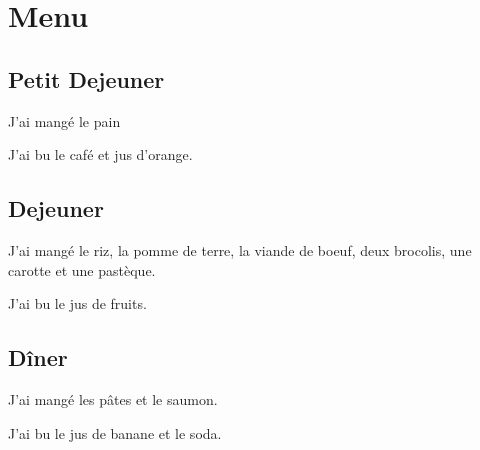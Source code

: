 \section{Menu}


\subsection*{Petit Dejeuner}
J'ai mangé le pain

J'ai bu le café et jus d'orange.

\subsection*{Dejeuner}
J'ai mangé le riz, la pomme de terre, la viande de boeuf, deux brocolis, une carotte et une pastèque.

J'ai bu le jus de fruits.

\subsection*{Dîner}
J'ai mangé les pâtes et le saumon.

J'ai bu le jus de banane et le soda.